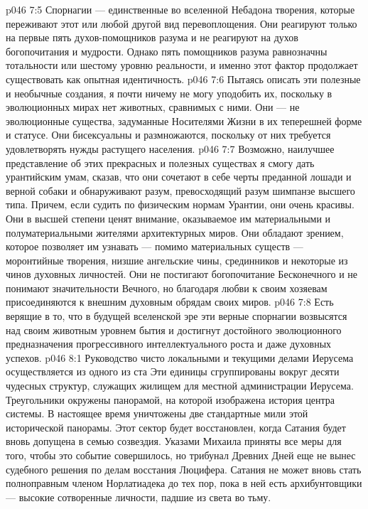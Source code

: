 \vs p046 7:5 Спорнагии --- единственные во вселенной Небадона творения, которые переживают этот или любой другой вид перевоплощения. Они реагируют только на первые пять духов\hyp{}помощников разума и не реагируют на духов богопочитания и мудрости. Однако пять помощников разума равнозначны тотальности или шестому уровню реальности, и именно этот фактор продолжает существовать как опытная идентичность.
\vs p046 7:6 \pc Пытаясь описать эти полезные и необычные создания, я почти ничему не могу уподобить их, поскольку в эволюционных мирах нет животных, сравнимых с ними. Они --- не эволюционные существа, задуманные Носителями Жизни в их теперешней форме и статусе. Они бисексуальны и размножаются, поскольку от них требуется удовлетворять нужды растущего населения.
\vs p046 7:7 Возможно, наилучшее представление об этих прекрасных и полезных существах я смогу дать урантийским умам, сказав, что они сочетают в себе черты преданной лошади и верной собаки и обнаруживают разум, превосходящий разум шимпанзе высшего типа. Причем, если судить по физическим нормам Урантии, они очень красивы. Они в высшей степени ценят внимание, оказываемое им материальными и полуматериальными жителями архитектурных миров. Они обладают зрением, которое позволяет им узнавать --- помимо материальных существ --- моронтийные творения, низшие ангельские чины, срединников и некоторые из чинов духовных личностей. Они не постигают богопочитание Бесконечного и не понимают значительности Вечного, но благодаря любви к своим хозяевам присоединяются к внешним духовным обрядам своих миров.
\vs p046 7:8 \pc Есть верящие в то, что в будущей вселенской эре эти верные спорнагии возвысятся над своим животным уровнем бытия и достигнут достойного эволюционного предназначения прогрессивного интеллектуального роста и даже духовных успехов.
\vs p046 8:1 Руководство чисто локальными и текущими делами Иерусема осуществляется из одного из ста  Эти единицы сгруппированы вокруг десяти чудесных структур, служащих жилищем для местной администрации Иерусема. Треугольники окружены панорамой, на которой изображена история центра системы. В настоящее время уничтожены две стандартные мили этой исторической панорамы. Этот сектор будет восстановлен, когда Сатания будет вновь допущена в семью созвездия. Указами Михаила приняты все меры для того, чтобы это событие совершилось, но трибунал Древних Дней еще не вынес судебного решения по делам восстания Люцифера. Сатания не может вновь стать полноправным членом Норлатиадека до тех пор, пока в ней есть архибунтовщики --- высокие сотворенные личности, падшие из света во тьму.
